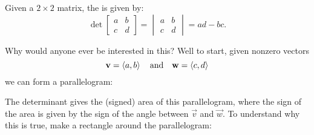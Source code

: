 \documentclass{ximera}
\begin{document}
\begin{definition}
  Given a $2\times2$ matrix, the  is given by:
  \[
  \det
  \begin{bmatrix}
    a & b\\
    c & d
  \end{bmatrix}
  =
  \begin{vmatrix}
    a & b\\
    c & d
  \end{vmatrix}
  = ad -bc.
  \]
\end{definition}
Why would anyone ever be interested in this? Well to start, given nonzero vectors
\[
\mathbf{v} = \left\langle a,b\right\rangle\quad\text{and}\quad\mathbf{w}=\left\langle c,d\right\rangle
\]
we can form a parallelogram:
\begin{image}
\end{image}
The determinant gives the (signed) area of this parallelogram, where
the sign of the area is given by the sign of the angle between
$\vec{v}$ and $\vec{w}$. To understand why this is true, make a
rectangle around the parallelogram:
\end{document}
